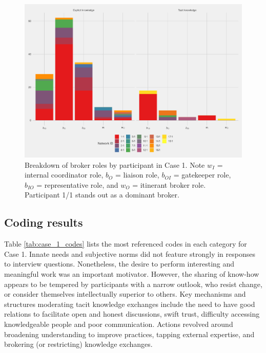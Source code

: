 \begin{figure}
\centering
\includegraphics[width = \textwidth]{Images/gf_case1.pdf}
\caption[Breakdown of broker roles by participant in Case 1]{Breakdown of broker roles by participant in Case 1. Note $w_I$ = internal coordinator role, $b_O$ = liaison role, $b_{OI}$ = gatekeeper role, $b_{IO}$ = representative role, and $w_O$ = itinerant broker role. Participant 1/1 stands out as a dominant broker.}
\label{fig:gf_c1}
\end{figure}

\subsection{Coding results}

Table \ref{tab:case_1_codes} lists the most referenced codes in each category for Case 1. Innate needs and subjective norms did not feature strongly in responses to interview questions. Nonetheless, the desire to perform interesting and meaningful work was an important motivator. However, the sharing of know-how appears to be tempered by participants with a narrow outlook, who resist change, or consider themselves intellectually superior to others. Key mechanisms and structures moderating tacit knowledge exchanges include the need to have good relations to facilitate open and honest discussions, swift trust, difficulty accessing knowledgeable people and poor communication. Actions revolved around broadening understanding to improve practices, tapping external expertise, and brokering (or restricting) knowledge exchanges. 

